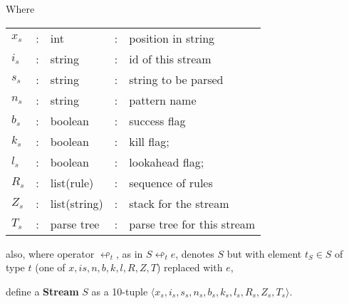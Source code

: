 \begin{framed}

 Where

  \begin{center}
   \begin{tabular}{lclcl}
    $x_s$ & : & int          & : & position in string     \\
    $i_s$ & : & string       & : & id of this stream      \\
    $s_s$ & : & string       & : & string to be parsed    \\
    $n_s$ & : & string       & : & pattern name           \\
    $b_s$ & : & boolean      & : & success flag           \\
    $k_s$ & : & boolean      & : & kill flag;             \\
    $l_s$ & : & boolean      & : & lookahead flag;        \\
    $R_s$ & : & list(rule)   & : & sequence of rules      \\
    $Z_s$ & : & list(string) & : & stack for the stream   \\
    $T_s$ & : & parse tree   & : & parse tree for this stream \\
   \end{tabular}
  \end{center}

 also, where operator $\looparrowleft_t$, as in $S \looparrowleft_t e$, denotes
$S$ but with element $t_S \in S$ of type $t$ (one of $x, i s, n, b, k, l, R, Z,
T$) replaced with $e$,

 \vspace{12pt}
 define a \textbf{Stream} $S$ as a 10-tuple $\langle 
x_s, i_s, s_s, n_s, b_s, k_s, l_s, R_s, Z_s, T_s
\rangle$.

\end{framed}

